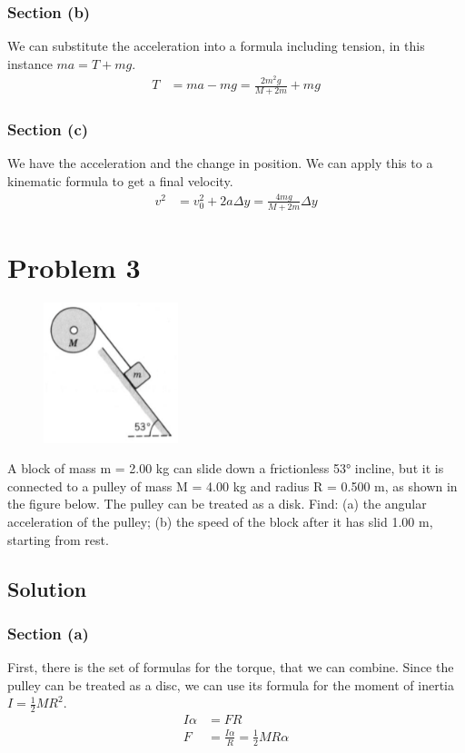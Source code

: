 \documentclass[12pt]{article}
\begin{document}
\subsubsection{Section (b)}
We can substitute the acceleration into a formula including tension, in this instance \(ma = T + mg\).
\begin{align}
    T   &=  ma - mg
        =   \frac{2m^2g}{M + 2m} + mg
\end{align}

\subsubsection{Section (c)}
We have the acceleration and the change in position. We can apply this to a kinematic formula to get a final velocity.
\begin{align}
    v^2 &=  v_0^2 + 2a\Delta y
        =   \frac{4mg}{M + 2m}\Delta y
\end{align}

\pagebreak

\section{Problem 3}
\begin{figure}
    \vspace{-30pt}
    \includegraphics[width=0.35\textwidth]{graph_3.png} 
\end{figure}
A block of mass m = 2.00 kg can slide down a frictionless 53\unit{\degree} incline, but it is connected to a pulley of mass M = 4.00 kg and radius R = 0.500 m, as shown in the figure below. The pulley can be treated as a disk. Find: (a) the angular acceleration of the pulley; (b) the speed of the block after it has slid 1.00 m, starting from rest.

\subsection{Solution}
\subsubsection{Section (a)}
First, there is the set of formulas for the torque, that we can combine. Since the pulley can be treated as a disc, we can use its formula for the moment of inertia \(I = \frac{1}{2}MR^2\).
\begin{align}
    I\alpha &=  F R\\
    F   &=  \frac{I\alpha}{R}
        =   \frac{1}{2}MR\alpha
\end{align}
\end{document}
